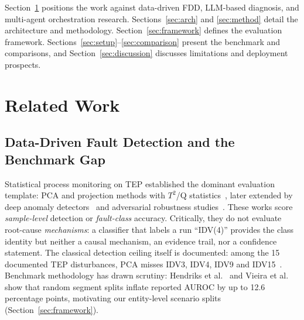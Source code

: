 \documentclass[journal]{IEEEtran}
\begin{document}
Section~\ref{sec:related} positions the work against data-driven FDD, LLM-based diagnosis, and multi-agent orchestration research. Sections~\ref{sec:arch} and \ref{sec:method} detail the architecture and methodology. Section~\ref{sec:framework} defines the evaluation framework. Sections~\ref{sec:setup}--\ref{sec:comparison} present the benchmark and comparisons, and Section~\ref{sec:discussion} discusses limitations and deployment prospects.

\section{Related Work}
\label{sec:related}

\subsection{Data-Driven Fault Detection and the Benchmark Gap}
Statistical process monitoring on TEP established the dominant evaluation template: PCA and projection methods with $T^2$/Q statistics~\cite{downs1993plant,goldenberg2019fault}, later extended by deep anomaly detectors~\cite{hartung2023deep,tuli2022tranad} and adversarial robustness studies~\cite{pozdnyakov2024adversarial}. These works score \emph{sample-level} detection or \emph{fault-class} accuracy. Critically, they do not evaluate root-cause \emph{mechanisms}: a classifier that labels a run ``IDV(4)'' provides the class identity but neither a causal mechanism, an evidence trail, nor a confidence statement. The classical detection ceiling itself is documented: among the 15 documented TEP disturbances, PCA misses IDV3, IDV4, IDV9 and IDV15~\cite{chiang2001fault}. Benchmark methodology has drawn scrutiny: Hendriks et al.~\cite{hendriks2022towards} and Vieira et al.~\cite{vieira2026towards} show that random segment splits inflate reported AUROC by up to 12.6 percentage points, motivating our entity-level scenario splits (Section~\ref{sec:framework}).
\end{document}

